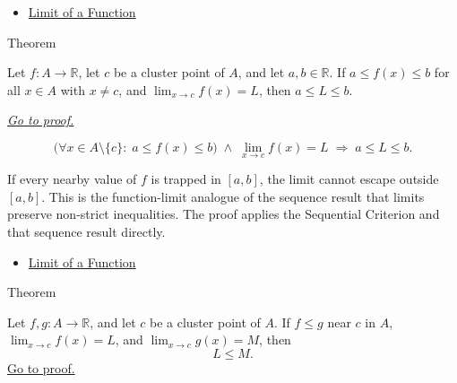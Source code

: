 \begin{dependencies}
\begin{itemize}
  \item \hyperref[def:limit-function]{Limit of a Function}
\end{itemize}
\end{dependencies}


\begin{theorembox}{Theorem}
\begin{theorem}
\label{thm:bounded-limits}
Let $f : A \to \mathbb{R}$, let $c$ be a cluster point of $A$, and
let $a, b \in \mathbb{R}$. If $a \leq f(x) \leq b$ for all $x \in A$
with $x \neq c$, and $\lim_{x\to c}f(x)=L$, then
$a \leq L \leq b$.

\smallskip\noindent
\hyperref[prf:bounded-limits]{\textit{Go to proof.}}
\end{theorem}
\end{theorembox}

\begin{remark*}
\[
  \bigl(\forall x \in A \setminus \{c\} :\; a \leq f(x) \leq b\bigr)
  \;\wedge\;
  \lim_{x\to c}f(x)=L
  \;\Rightarrow\;
  a \leq L \leq b.
\]
\end{remark*}

\begin{remark*}[Interpretation]
If every nearby value of $f$ is trapped in $[a,b]$, the limit cannot
escape outside $[a,b]$. This is the function-limit analogue of the
sequence result that limits preserve non-strict inequalities. The
proof applies the Sequential Criterion and that sequence result
directly.
\end{remark*}

\begin{dependencies}
\begin{itemize}
  \item \hyperref[def:limit-function]{Limit of a Function}
\end{itemize}
\end{dependencies}


\begin{theorembox}{Theorem}
\begin{theorem}
\label{thm:comparison-function-limits}
Let \(f,g:A\to\mathbb{R}\), and let \(c\) be a cluster point of \(A\).
If \(f\leq g\) near \(c\) in \(A\), \(\lim_{x\to c}f(x)=L\), and
\(\lim_{x\to c}g(x)=M\), then
\[
  L\leq M.
\]
\hyperref[prf:comparison-function-limits]{Go to proof.}
\end{theorem}
\end{theorembox}


